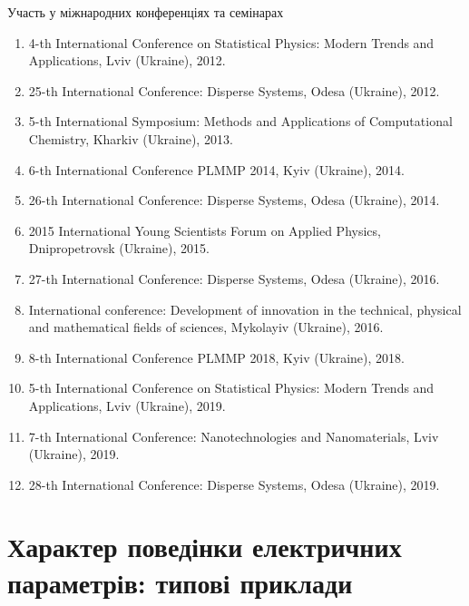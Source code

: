 \documentclass[10pt]{beamer}
\begin{document}
\begin{frame}{Участь у міжнародних конференціях та семінарах}

{\footnotesize
\begin{enumerate}
\item 4-th International Conference on Statistical Physics: Modern Trends and Applications, Lviv (Ukraine), 2012.

\item 25-th International Conference: Disperse Systems, Odesa (Ukraine), 2012.

\item 5-th International Symposium: Methods and Applications of Computational Chemistry,  Kharkiv (Ukraine), 2013.

\item 6-th International Conference PLMMP 2014,  Kyiv (Ukraine), 2014.

\item 26-th International Conference: Disperse Systems,  Odesa (Ukraine), 2014.

\item 2015 International Young Scientists Forum on Applied Physics,  Dnipropetrovsk (Ukraine), 2015.

\item 27-th International Conference: Disperse Systems, Odesa (Ukraine), 2016.

\item International conference: Development of innovation in the technical, physical and mathematical fields of sciences, Mykolayiv (Ukraine), 2016.

\item 8-th International  Conference PLMMP 2018, Kyiv (Ukraine), 2018.

\item 5-th International Conference on Statistical Physics: Modern Trends and Applications, Lviv (Ukraine), 2019.

\item 7-th International Conference: Nano\-technologies and Nanomaterials,  Lviv (Ukraine), 2019.

\item 28-th International Conference: Disperse Systems, Odesa (Ukraine), 2019.
\end{enumerate}
}

\end{frame}


\section{Характер поведінки електричних параметрів: типові приклади}
\end{document}
